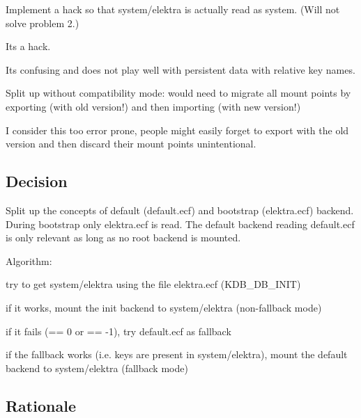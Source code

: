 \begin{DoxyItemize}
\item Implement a hack so that {\ttfamily system/elektra} is actually read as {\ttfamily system}. (Will not solve problem 2.)
\begin{DoxyItemize}
\item Its a hack.
\item Its confusing and does not play well with persistent data with relative key names.
\end{DoxyItemize}
\item Split up without compatibility mode\+: would need to migrate all mount points by exporting (with old version!) and then importing (with new version!)
\begin{DoxyItemize}
\item I consider this too error prone, people might easily forget to export with the old version and then discard their mount points unintentional.
\end{DoxyItemize}
\end{DoxyItemize}

\subsection*{Decision}

Split up the concepts of default ({\ttfamily default.\+ecf}) and bootstrap ({\ttfamily elektra.\+ecf}) backend. During bootstrap only {\ttfamily elektra.\+ecf} is read. The default backend reading {\ttfamily default.\+ecf} is only relevant as long as no root backend is mounted.

Algorithm\+:


\begin{DoxyEnumerate}
\item try to get system/elektra using the file elektra.\+ecf (K\+D\+B\+\_\+\+D\+B\+\_\+\+I\+N\+IT)
\item if it works, mount the init backend to system/elektra (non-\/fallback mode)
\item if it fails (== 0 or == -\/1), try default.\+ecf as fallback
\item if the fallback works (i.\+e. keys are present in system/elektra), mount the default backend to system/elektra (fallback mode)
\end{DoxyEnumerate}

\subsection*{Rationale}


